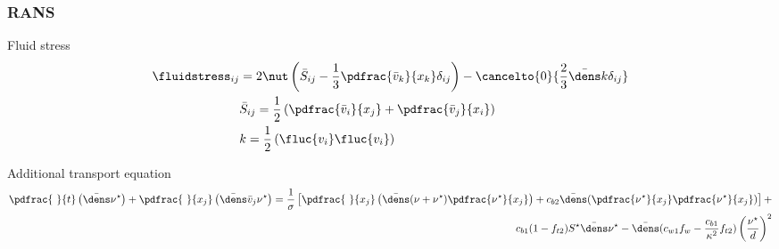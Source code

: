 \begin{frame}
\frametitle{RANS}

Fluid stress
\begin{align*}
\fluidstress_{ij}&=2 \nut \left( \bar{S}_{ij}-\frac{1}{3} \pdfrac{\bar{v}_k}{x_k} \delta_{ij} \right) - \cancelto{0}{\frac{2}{3}\bar{\dens}k\delta_{ij}} \\
&\bar{S}_{ij}=\frac{1}{2}\left( \pdfrac{\bar{v}_i}{x_j}+\pdfrac{\bar{v}_j}{x_i} \right) \\
&k=\frac{1}{2} \left( \fluc{v_i}\fluc{v_i} \right)
\end{align*}

Additional transport equation
\begin{align*}
\pdfrac{~}{t}\left( \bar{\dens} \nu^{\star}\right) + \pdfrac{~}{x_j}\left( \bar{\dens}\bar{v}_j \nu^{\star} \right) = 
\frac{1}{\sigma}\left[ \pdfrac{~}{x_j} \left( \bar{\dens}(\nu+\nu^{\star})\pdfrac{\nu^{\star}}{x_j} \right) + c_{b2} \bar{\dens}(\pdfrac{\nu^{\star}}{x_j}\pdfrac{\nu^{\star}}{x_j})\right]+\nonumber\\
c_{b1}(1-f_{t2}) S^{\star} \bar{\dens}\nu^{\star}-\bar{\dens}(c_{w1}f_{w}-\frac{c_{b1}}{\kappa^2} f_{t2})
\left(\frac{\nu^{\star}}{d}\right)^{2}
\end{align*}
\end{frame}
